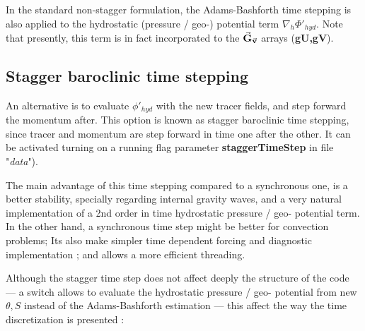 In the standard non-stagger formulation, 
the Adams-Bashforth time stepping is also applied to the 
hydrostatic (pressure / geo-) potential term $\nabla_h \Phi'_{hyd}$. 
Note that presently, this term is in fact incorporated to the 
$\vec{\bf G}_{\vec{\bf v}}$ arrays ({\bf gU,gV}).

\subsection{Stagger baroclinic time stepping}

An alternative is to evaluate $\phi'_{hyd}$ with the 
new tracer fields, and step forward the momentum after.
This option is known as stagger baroclinic time stepping, 
since tracer and momentum are step forward in time one after the other.
It can be activated turning on a running flag parameter 
{\bf staggerTimeStep} in file "{\it data}"). 

The main advantage of this time stepping compared to a synchronous one,
is a better stability, specially regarding internal gravity waves,
and a very natural implementation of a 2nd order in time 
hydrostatic pressure / geo- potential term.
In the other hand, a synchronous time step might be  better
for convection problems; Its also make simpler time dependent forcing
and diagnostic implementation ; and allows a more efficient threading.

Although the stagger time step does not affect deeply the 
structure of the code --- a switch allows to evaluate the 
hydrostatic pressure / geo- potential from new $\theta,S$ 
instead of the Adams-Bashforth estimation ---
this affect the way the time discretization is presented :

